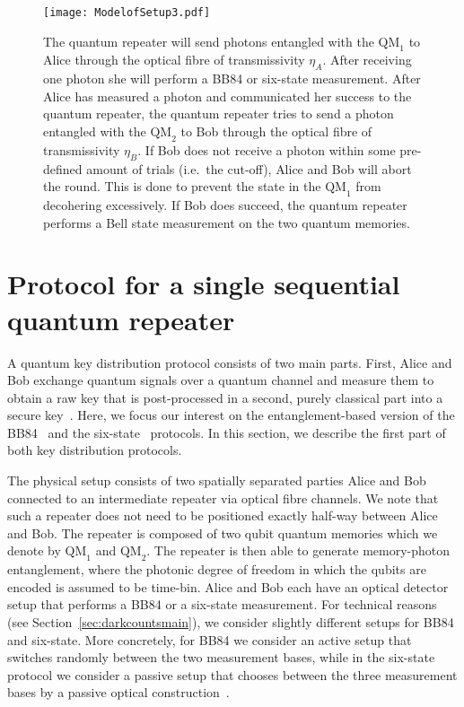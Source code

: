 \documentclass[aps,pra,reprint,superscriptaddress]{revtex4-1}
\begin{document}
\begin{center}
\begin{figure}
\texttt{[image: ModelofSetup3.pdf]}
\caption{The quantum repeater will send photons entangled with the $\textrm{QM}_1$ to Alice through the optical fibre of transmissivity $\eta_A$. After receiving one photon she will perform a BB84 or six-state measurement. After Alice has measured a photon and communicated her success to the quantum repeater, the quantum repeater tries to send a photon entangled with the $\textrm{QM}_2$ to Bob through the optical fibre of transmissivity $\eta_B$. If Bob does not receive a photon within some pre-defined amount of trials (i.e.~the cut-off), Alice and Bob will abort the round.
This is done to prevent the state in the $\textrm{QM}_1$ from decohering excessively. If Bob does succeed, the quantum repeater performs a Bell state measurement on the two quantum memories.}
\label{fig:modelofsetup}
\end{figure}
\end{center}



\section{Protocol for a single sequential quantum repeater}
\label{sec:model}
A quantum key distribution protocol consists of two main parts. First, Alice and Bob exchange quantum signals over a quantum channel and measure them to obtain a raw key that is post-processed in a second, purely classical part into a secure key~\cite{scarani2009security}. Here, we focus our interest on the entanglement-based version of the BB84~\cite{Bennett_84} and the six-state~\cite{bruss1998optimal} protocols. In this section, we describe the first part of both key distribution protocols. 

The physical setup consists of two spatially separated parties Alice and Bob connected to an intermediate repeater via optical fibre channels. We note that such a repeater does not need to be positioned exactly half-way between Alice and Bob. The repeater is composed of two qubit quantum memories which we denote by $\textrm{QM}_1$ and $\textrm{QM}_2$. The repeater is then able to generate memory-photon entanglement, where the photonic degree of freedom in which the qubits are encoded is assumed to be time-bin. Alice and Bob each have an optical detector setup that performs a BB84 or a six-state measurement. For technical reasons (see Section~\ref{sec:darkcountsmain}), we consider slightly different setups for BB84 and six-state. More concretely, for BB84 we consider an active setup that switches randomly between the two measurement bases, while in the six-state protocol we consider a passive setup that chooses between the three measurement bases by a passive optical construction~\cite{gittsovich2014squashing}.
\end{document}
